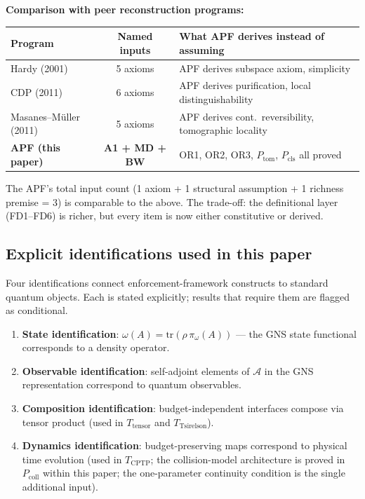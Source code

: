 \documentclass[11pt]{article}
\theoremstyle{remark}
\begin{document}
\medskip\noindent\textbf{Comparison with peer reconstruction programs:}

\smallskip
\begin{center}
\smallskip
\begin{tabular}{@{}lcp{6.5cm}@{}}
\textbf{Program} & \textbf{Named inputs} & \textbf{What APF derives instead of assuming} \\[2pt]
\hline\noalign{\smallskip}
Hardy (2001) & 5 axioms & APF derives subspace axiom, simplicity \\
CDP (2011) & 6 axioms & APF derives purification, local distinguishability \\
Masanes--M\"uller (2011) & 5 axioms & APF derives cont.\ reversibility, tomographic locality \\
\textbf{APF (this paper)} & \textbf{A1 + MD + BW} & OR1, OR2, OR3, $P_{\mathrm{tom}}$, $P_{\mathrm{cls}}$ all proved \\
\end{tabular}
\label{tab:peer_comparison}
\end{center}

\smallskip\noindent The APF's total input count (1 axiom + 1 structural assumption + 1 richness premise = 3) is comparable to the above.  The trade-off: the definitional layer (FD1--FD6) is richer, but every item is now either constitutive or derived.



\subsection{Explicit identifications used in this paper}
\label{sec:identifications}

Four identifications connect enforcement-framework constructs to standard quantum objects.  Each is stated explicitly; results that require them are flagged as conditional.

\begin{enumerate}[nosep,leftmargin=2em,itemsep=4pt]
\item \textbf{State identification}: $\omega(A) = \mathrm{tr}(\rho\,\pi_\omega(A))$ — the GNS state functional corresponds to a density operator.
\item \textbf{Observable identification}: self-adjoint elements of $\mathcal{A}$ in the GNS representation correspond to quantum observables.
\item \textbf{Composition identification}: budget-independent interfaces compose via tensor product (used in $T_{\mathrm{tensor}}$ and $T_{\mathrm{Tsirelson}}$).
\item \textbf{Dynamics identification}: budget-preserving maps correspond to physical time evolution (used in $T_{\mathrm{CPTP}}$; the collision-model architecture is proved in $P_{\mathrm{coll}}$ within this paper; the one-parameter continuity condition is the single additional input).
\end{enumerate}
\end{document}
